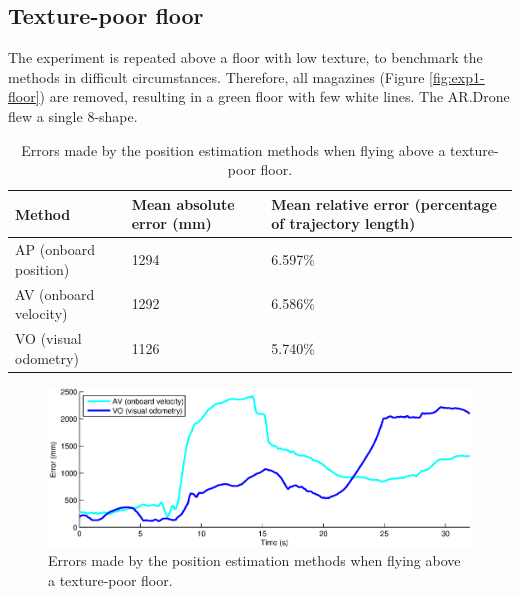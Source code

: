 





\subsection{Texture-poor floor}
\label{sec:exp1-texture-poor}
The experiment is repeated above a floor with low texture, to benchmark the methods in difficult circumstances.
Therefore, all magazines (Figure \ref{fig:exp1-floor}) are removed, resulting in a green floor with few white lines.
The AR.Drone flew a single 8-shape.


\begin{table}[htb!]
    \centering
    \begin{tabular}
        { | l | l | l | } 
	\hline
	Method & Mean absolute error (\small{mm}) & Mean relative error (percentage of trajectory length) \\
        \hline
	AP (onboard position) & 1294 & 6.597\% \\
        AV (onboard velocity) & 1292 & 6.586\% \\
	VO (visual odometry) & 1126 & 5.740\% \\
	\hline
    \end{tabular}
    \caption{Errors made by the position estimation methods when flying above a texture-poor floor.}
    \label{tab:res_mapping-poor}
\end{table}

\begin{figure}[htb!]
\centering
\includegraphics[width=\linewidth]{images/exp1-run2-error.eps}
\caption{Errors made by the position estimation methods when flying above a texture-poor floor.}
\label{fig:exp1-notexture-error}
\end{figure}

